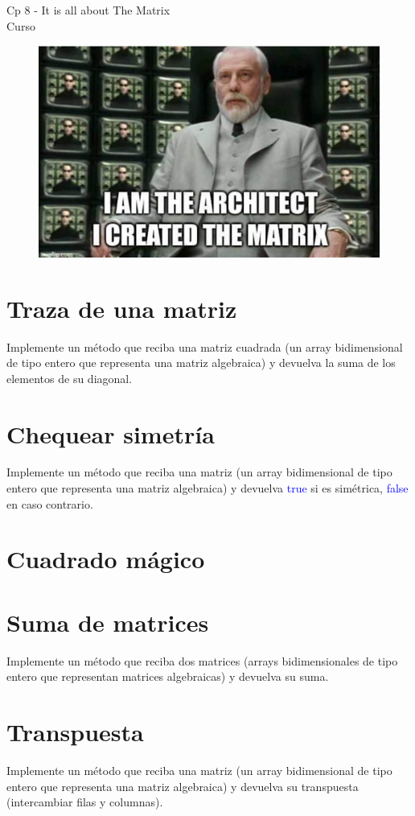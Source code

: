 \begin{center}
    \begin{large}
    Cp 8 - It is all about The Matrix\\
    Curso \academicyear\\
    \end{large}
    \begin{figure}[h]
    	\centering
    	\includegraphics[width=0.5\linewidth]{cp7/matrix.png}
    \end{figure}
\end{center}

\section{Traza de una matriz}
Implemente un método que reciba una matriz cuadrada (un array bidimensional de tipo entero que representa una matriz algebraica) y devuelva la suma de los elementos de su diagonal.

\section{Chequear simetría}
Implemente un método que reciba una matriz (un array bidimensional de tipo entero que representa una matriz algebraica) y devuelva \textcolor{blue}{true} si es simétrica, \textcolor{blue}{false} en caso contrario.

\section{Cuadrado mágico}


\section{Suma de matrices}
Implemente un método que reciba dos matrices (arrays bidimensionales de tipo entero que representan matrices algebraicas) y devuelva su suma.

\section{Transpuesta}
Implemente un método que reciba una matriz (un array bidimensional de tipo entero que representa una matriz algebraica) y devuelva su transpuesta (intercambiar filas y columnas).

